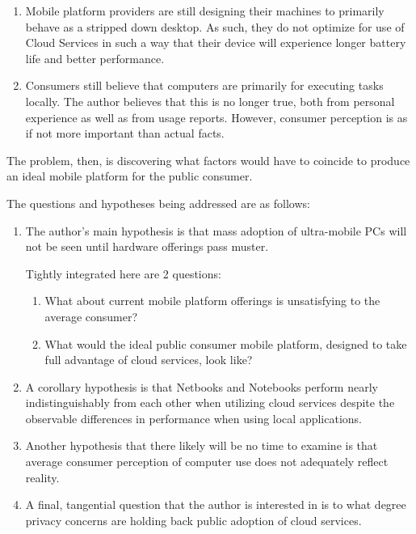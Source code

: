 \documentclass[12pt,oneside,letterpaper,titlepage]{article}
\begin{document}
\begin{enumerate}

\item Mobile platform providers are still designing their machines to primarily
  behave as a stripped down desktop.  As such, they do not optimize for use of
  Cloud Services in such a way that their device will experience longer battery
  life and better performance.

\item Consumers still believe that computers are primarily for executing tasks
  locally.  The author believes that this is no longer true, both from personal
  experience as well as from usage reports.  However, consumer perception is as
  if not more important than actual facts.

\end{enumerate}

The problem, then, is discovering what factors would have to coincide to produce
an ideal mobile platform for the public consumer.

The questions and hypotheses being addressed are as follows:

\begin{enumerate}

  \item The author's main hypothesis is that mass adoption of ultra-mobile PCs
    will not be seen until hardware offerings pass muster.

  Tightly integrated here are 2 questions:

  \begin{enumerate}

    \item What about current mobile platform offerings is unsatisfying to the
      average consumer?

    \item What would the ideal public consumer mobile platform, designed to take
      full advantage of cloud services, look like?

  \end{enumerate}

  \item A corollary hypothesis is that Netbooks and Notebooks perform nearly
    indistinguishably from each other when utilizing cloud services despite the
    observable differences in performance when using local applications.

  \item Another hypothesis that there likely will be no time to examine is that
    average consumer perception of computer use does not adequately reflect
    reality.

  \item A final, tangential question that the author is interested in is to what
    degree privacy concerns are holding back public adoption of cloud services.

\end{enumerate}
\end{document}
